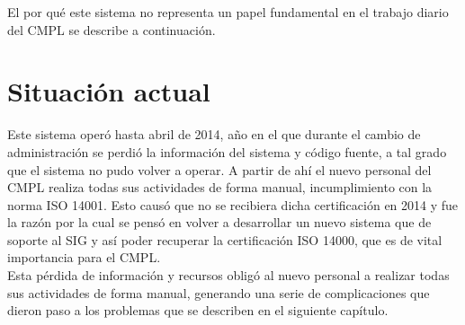 	El por qué este sistema no representa un papel fundamental en el trabajo diario del CMPL se describe a continuación.
		
	\section{Situación actual}
	Este sistema operó hasta abril de 2014, año en el que durante el cambio de administración se perdió la información del sistema y código fuente, a  tal grado que el sistema no pudo volver a operar. A partir de ahí el nuevo personal del CMPL realiza todas sus actividades de forma manual, incumplimiento con la norma ISO 14001. Esto causó que no se recibiera dicha certificación en 2014 y fue la razón por la cual se pensó en volver a desarrollar un nuevo sistema que de soporte al SIG y así poder recuperar la certificación ISO 14000, que es de vital importancia para el CMPL.\\
	
	Esta pérdida de información y recursos obligó al nuevo personal a realizar todas sus actividades de forma manual, generando una serie de complicaciones que dieron paso a los problemas que se describen en el siguiente capítulo.\\